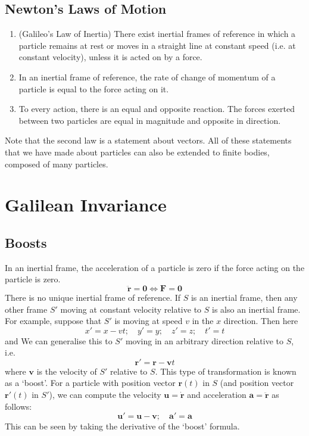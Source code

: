 \documentclass{article}
\begin{document}
\subsection{Newton's Laws of Motion}
\begin{enumerate}
    \item (Galileo's Law of Inertia) There exist inertial frames of reference in which a particle remains at rest or moves in a straight line at constant speed (i.e. at constant velocity), unless it is acted on by a force.
    \item In an inertial frame of reference, the rate of change of momentum of a particle is equal to the force acting on it.
    \item To every action, there is an equal and opposite reaction. The forces exerted between two particles are equal in magnitude and opposite in direction.
\end{enumerate}
Note that the second law is a statement about vectors. All of these statements that we have made about particles can also be extended to finite bodies, composed of many particles.

\section{Galilean Invariance}
\subsection{Boosts}
In an inertial frame, the acceleration of a particle is zero if the force acting on the particle is zero.
\[ \ddot{\bm r} = \bm 0 \iff \bm F = \bm 0 \]
There is no unique inertial frame of reference. If $S$ is an inertial frame, then any other frame $S'$ moving at constant velocity relative to $S$ is also an inertial frame. For example, suppose that $S'$ is moving at speed $v$ in the $x$ direction. Then here
\[ x'=x-vt;\quad y'=y;\quad z'=z;\quad t'=t \]
and
We can generalise this to $S'$ moving in an arbitrary direction relative to $S$, i.e.
\[ \bm r' = \bm r - \bm v t \]
where $\bm v$ is the velocity of $S'$ relative to $S$. This type of transformation is known as a `boost'. For a particle with position vector $\bm r(t)$ in $S$ (and position vector $\bm r'(t)$ in $S'$), we can compute the velocity $\bm u = \dot{\bm r}$ and acceleration $\bm a = \ddot{\bm r}$ as follows:
\[ \bm u' = \bm u - \bm v;\quad \bm a' = \bm a \]
This can be seen by taking the derivative of the `boost' formula.
\end{document}
